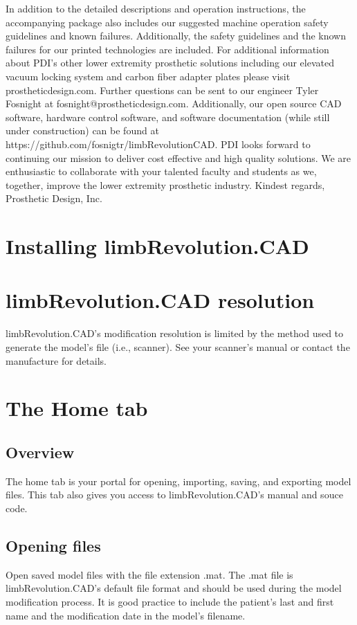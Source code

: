 \documentclass[twoside,a4paper]{refrep}
\begin{document}
	In addition to the detailed descriptions and operation instructions, the accompanying package also includes our suggested machine operation safety guidelines and known failures. Additionally, the safety guidelines and the known failures for our printed technologies are included.
	For additional information about PDI’s other lower extremity prosthetic solutions including our elevated vacuum locking system and carbon fiber adapter plates please visit prostheticdesign.com. Further questions can be sent to our engineer Tyler Fosnight at fosnight@prostheticdesign.com. Additionally, our open source CAD software, hardware control software, and software documentation (while still under construction) can be found at https://github.com/fosnigtr/limbRevolutionCAD.
	PDI looks forward to continuing our mission to deliver cost effective and high quality solutions. We are enthusiastic to collaborate with your talented faculty and students as we, together, improve the lower extremity prosthetic industry.
	Kindest regards,
	Prosthetic Design, Inc. 
	
	\section{Installing limbRevolution.CAD}
	\label{Install}
	
	\section{limbRevolution.CAD resolution}
	\label{Resolution}
	limbRevolution.CAD's modification resolution is limited by the method used to generate the model's file (i.e., scanner). See your scanner's manual or contact the manufacture for details. 
	\section{The Home tab}
	\subsection{Overview}
	The home tab is your portal for opening, importing, saving, and exporting model files. This tab also gives you access to limbRevolution.CAD's manual and souce code.
	\subsection{Opening files}
	\label{Open}
	Open saved model files with the file extension .mat. The .mat file is limbRevolution.CAD's default file format and should be used during the model modification process. It is good practice to include the patient's last and first name and the modification date in the model's filename.  
\end{document}
